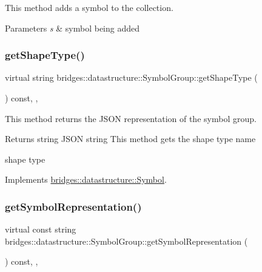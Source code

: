 This method adds a symbol to the collection. 


\begin{DoxyParams}{Parameters}
{\em s} & symbol being added \\
\hline
\end{DoxyParams}
\mbox{\label{classbridges_1_1datastructure_1_1_symbol_group_a64dfd163d201b6759b1d21f90584e670}} 
\subsubsection{\texorpdfstring{get\+Shape\+Type()}{getShapeType()}}
{\footnotesize\ttfamily virtual string bridges\+::datastructure\+::\+Symbol\+Group\+::get\+Shape\+Type (\begin{DoxyParamCaption}{ }\end{DoxyParamCaption}) const\hspace{0.3cm}{\ttfamily [inline]}, {\ttfamily [override]}, {\ttfamily [virtual]}}



This method returns the J\+S\+ON representation of the symbol group. 

\begin{DoxyReturn}{Returns}
string J\+S\+ON string This method gets the shape type name

shape type 
\end{DoxyReturn}


Implements \hyperlink{classbridges_1_1datastructure_1_1_symbol_a1fb7cabce2915b103b8474658e8549f8}{bridges\+::datastructure\+::\+Symbol}.

\mbox{\label{classbridges_1_1datastructure_1_1_symbol_group_af3a4109c7a19314a611e879cb2b0aeca}} 
\subsubsection{\texorpdfstring{get\+Symbol\+Representation()}{getSymbolRepresentation()}}
{\footnotesize\ttfamily virtual const string bridges\+::datastructure\+::\+Symbol\+Group\+::get\+Symbol\+Representation (\begin{DoxyParamCaption}{ }\end{DoxyParamCaption}) const\hspace{0.3cm}{\ttfamily [inline]}, {\ttfamily [override]}, {\ttfamily [virtual]}}



